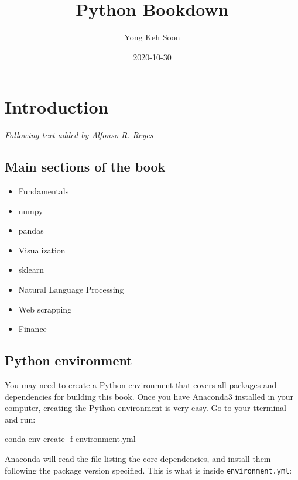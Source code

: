 \documentclass[
]{book}
\title{Python Bookdown}
\author{Yong Keh Soon}
\date{2020-10-30}
\newenvironment{Shaded}{\begin{snugshade}}{\end{snugshade}}
\newcommand{\ExtensionTok}[1]{#1}
\newcommand{\NormalTok}[1]{#1}
\providecommand{\tightlist}{%
  \setlength{\itemsep}{0pt}\setlength{\parskip}{0pt}}
\begin{document}
\maketitle

{
\hypersetup{linkcolor=}
\setcounter{tocdepth}{2}
\tableofcontents
}
\hypertarget{introduction}{%
\chapter*{Introduction}\label{introduction}}


\emph{Following text added by Alfonso R. Reyes}

\hypertarget{main-sections-of-the-book}{%
\section*{Main sections of the book}\label{main-sections-of-the-book}}


\begin{itemize}
\tightlist
\item
  Fundamentals
\item
  numpy
\item
  pandas
\item
  Visualization
\item
  sklearn
\item
  Natural Language Processing
\item
  Web scrapping
\item
  Finance
\end{itemize}

\hypertarget{python-environment}{%
\section*{Python environment}\label{python-environment}}


You may need to create a Python environment that covers all packages and dependencies for building this book. Once you have Anaconda3 installed in your computer, creating the Python environment is very easy. Go to your tterminal and run:

\begin{Shaded}
\begin{Highlighting}[]
\ExtensionTok{conda}\NormalTok{ env create -f environment.yml}
\end{Highlighting}
\end{Shaded}

Anaconda will read the file listing the core dependencies, and install them following the package version specified. This is what is inside \texttt{environment.yml}:
\end{document}
